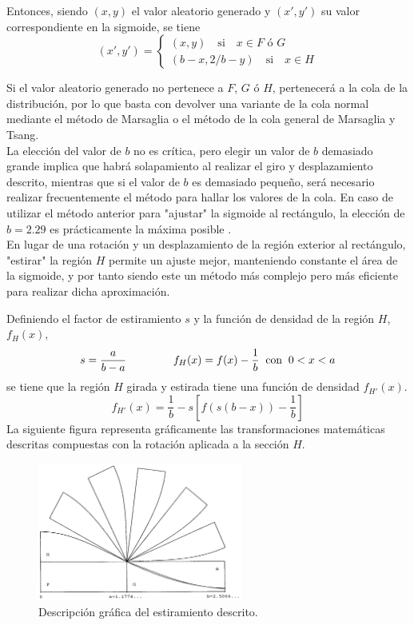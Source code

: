 \documentclass[a4paper,12pt]{article}
\begin{document}
	Entonces, siendo $(x,y)$ el valor aleatorio generado y $(x',y')$ su valor correspondiente en la sigmoide, se tiene
	$$
	(x',y') = 
	\begin{cases}
		(x,y) \quad \text{si} \quad x\in F \text{ ó } G \\
		(b-x,2/b-y) \quad \text{si} \quad x \in H
	\end{cases}
	$$  
	
	Si el valor aleatorio generado no pertenece a $F$, $G$ ó $H$, pertenecerá a la cola de la distribución, por lo que basta con devolver una variante de la cola normal mediante el método de Marsaglia o el método de la cola general de Marsaglia y Tsang.\\
		
	La elección del valor de $b$ no es crítica, pero elegir un valor de $b$ demasiado grande implica que habrá solapamiento al realizar el giro y desplazamiento descrito, mientras que si el valor de $b$ es demasiado pequeño, será necesario realizar frecuentemente el método para hallar los valores de la cola.
	En caso de utilizar el método anterior para "ajustar" la sigmoide al rectángulo, la elección de $b=2.29$ es prácticamente la máxima posible \cite{monty-python}. \\
		
	En lugar de una rotación y un desplazamiento de la región exterior al rectángulo, "estirar" la región $H$ permite un ajuste mejor, manteniendo constante el área de la sigmoide, y por tanto siendo este un método más complejo pero más eficiente para realizar dicha aproximación. 
	
	Definiendo el factor de estiramiento $s$ y la función de densidad de la región $H$, $f_H(x)$, 
	$$s=\dfrac{a}{b-a} \hspace{1.5cm} f_H(x)=f(x)-\dfrac{1}{b} \hspace{2mm} \text{con} \hspace{2mm} 0<x<a $$
	se tiene que la región $H$ girada y estirada tiene una función de densidad $f_{H'}(x)$.
	$$ f_{H'}(x) = \dfrac{1}{b} - s  \left[ f(s (b-x) ) -\dfrac{1}{b} \right] $$ 
	La siguiente figura representa gráficamente las transformaciones matemáticas descritas compuestas con la rotación aplicada a la sección $H$. 
	
	\begin{figure}[H]
		\centering
		\includegraphics[width=0.6\textwidth]{include/stretching_sigmoid.png}
		\caption{Descripción gráfica del estiramiento descrito. \cite{monty-python}}
	\end{figure}
	
\end{document}
